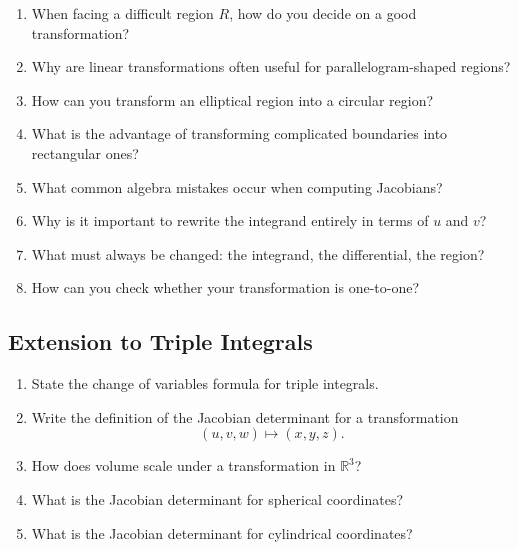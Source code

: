 \begin{enumerate}

\item  When facing a difficult region $R$, how do you decide on a good transformation?

\item  Why are linear transformations often useful for parallelogram-shaped regions?

\item  How can you transform an elliptical region into a circular region?

\item  What is the advantage of transforming complicated boundaries into rectangular ones?

\item  What common algebra mistakes occur when computing Jacobians?

\item  Why is it important to rewrite the integrand entirely in terms of $u$ and $v$?

\item  What must always be changed: the integrand, the differential, the region?

\item  How can you check whether your transformation is one-to-one?

\end{enumerate}

\subsection{Extension to Triple Integrals}

\begin{enumerate}

\item State the change of variables formula for triple integrals.

\item Write the definition of the Jacobian determinant for a transformation
  \[
    (u,v,w) \mapsto (x,y,z).
  \]

\item How does volume scale under a transformation in $\mathbb{R}^3$?

\item What is the Jacobian determinant for spherical coordinates?

\item What is the Jacobian determinant for cylindrical coordinates?

\end{enumerate}


